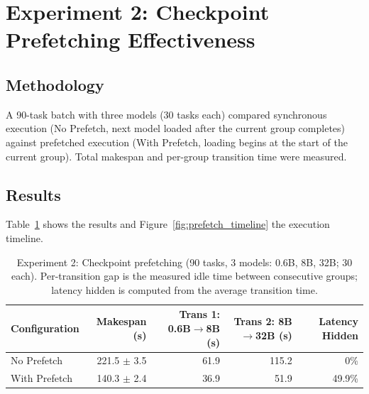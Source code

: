 \documentclass[logo,bsc,singlespacing,parskip,online]{infthesis}
\begin{document}
\section{Experiment 2: Checkpoint Prefetching Effectiveness}


\subsection{Methodology}

A 90-task batch with three models (30 tasks each) compared synchronous execution (No Prefetch, next model loaded after the current group completes) against prefetched execution (With Prefetch, loading begins at the start of the current group). Total makespan and per-group transition time were measured.

\subsection{Results}

Table~\ref{tab:exp2_results} shows the results and Figure~\ref{fig:prefetch_timeline} the execution timeline.

\begin{table}[htbp]
\centering
\caption{Experiment 2: Checkpoint prefetching (90 tasks, 3 models: 0.6B, 8B, 32B; 30 each). Per-transition gap is the measured idle time between consecutive groups; latency hidden is computed from the average transition time.}
\label{tab:exp2_results}
\begin{tabular}{lrrrr}
\toprule
Configuration & Makespan (s) & Trans 1: 0.6B$\to$8B (s) & Trans 2: 8B$\to$32B (s) & Latency Hidden \\
\midrule
No Prefetch  & 221.5 $\pm$ 3.5 & 61.9 & 115.2 & 0\% \\
With Prefetch & 140.3 $\pm$ 2.4 & 36.9 & 51.9  & 49.9\% \\
\bottomrule
\end{tabular}
\end{table}
\end{document}
